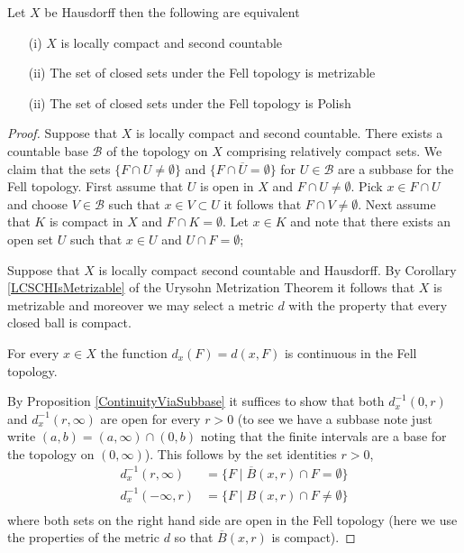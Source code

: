 \begin{thm}\label{MetrizabilityOfFellTopology}Let $X$ be Hausdorff then the following are equivalent
\begin{itemize}
\item[(i)] $X$ is locally compact and second countable
\item[(ii)] The set of closed sets under the Fell topology is metrizable
\item[(ii)] The set of closed sets under the Fell topology is Polish
\end{itemize}
\end{thm}
\begin{proof}
Suppose that $X$ is locally compact and second countable.  There exists a countable base $\mathcal{B}$ of the topology on $X$ comprising relatively compact sets.  We claim that the sets 
$\lbrace F \cap U \neq \emptyset \rbrace$ and $\lbrace F \cap \overline{U} = \emptyset \rbrace$ for $U \in \mathcal{B}$ are a subbase for the Fell topology.  First assume that $U$ is open in $X$ and
$F \cap U \neq \emptyset$.  Pick $x \in F \cap U$ and choose $V \in \mathcal{B}$ such that $x \in V \subset U$ it follows that $F \cap V \neq \emptyset$.  Next assume that $K$ is compact in $X$ and $F \cap K = \emptyset$.  Let $x \in K$ and note that there exists an open set $U$ such that $x \in U$ and $U \cap F = \emptyset$; 


Suppose that $X$ is locally compact second countable and Hausdorff.  By Corollary \ref{LCSCHIsMetrizable} of the Urysohn Metrization Theorem it follows that $X$ is metrizable and moreover we may select a metric $d$ with the property that every closed ball is compact.  
\begin{clm}For every $x \in X$ the function $d_x(F) = d(x, F)$ is continuous in the Fell topology.
\end{clm}
By Proposition \ref{ContinuityViaSubbase} it suffices to show that both $d_x^{-1}(0, r)$ and $d_x^{-1}(r, \infty)$ are open for every $r > 0$ (to see we have a subbase note just write $(a,b) = (a,\infty) \cap (0,b)$ noting that the finite intervals are a base for the topology on $(0,\infty)$).  This follows by the set identities $r > 0$,
\begin{align*}
d_x^{-1}(r, \infty) &= \lbrace F \mid \overline{B}(x,r) \cap F = \emptyset \rbrace \\
d_x^{-1}(-\infty, r) &= \lbrace F \mid B(x,r) \cap F \neq \emptyset \rbrace \\
\end{align*}
where both sets on the right hand side are open in the Fell topology (here we use the properties of the metric $d$ so that $\overline{B}(x,r)$ is compact).


\end{proof}

